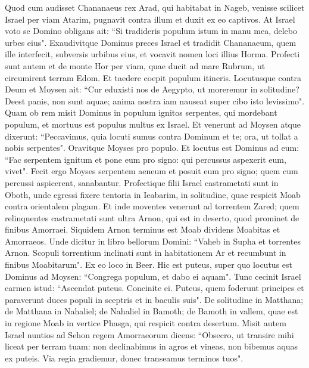 \begin{biblechapter}  
\verse Quod cum audisset Chananaeus rex Arad, qui habitabat in Nageb, venisse scilicet Israel per viam Atarim, pugnavit contra illum et duxit ex eo captivos. 
\verse At Israel voto se Domino obligans ait: “Si tradideris populum istum in manu mea, delebo urbes eius". 
\verse Exaudivitque Dominus preces Israel et tradidit Chananaeum, quem ille interfecit, subversis urbibus eius, et vocavit nomen loci illius Horma. 
\verse Profecti sunt autem et de monte Hor per viam, quae ducit ad mare Rubrum, ut circumirent terram Edom. Et taedere coepit populum itineris. 
\verse Locutusque contra Deum et Moysen ait: “Cur eduxisti nos de Aegypto, ut moreremur in solitudine? Deest panis, non sunt aquae; anima nostra iam nauseat super cibo isto levissimo". 
\verse Quam ob rem misit Dominus in populum ignitos serpentes, qui mordebant populum, et mortuus est populus multus ex Israel. 
\verse Et venerunt ad Moysen atque dixerunt: “Peccavimus, quia locuti sumus contra Dominum et te; ora, ut tollat a nobis serpentes". Oravitque Moyses pro populo. 
\verse Et locutus est Dominus ad eum: “Fac serpentem ignitum et pone eum pro signo: qui percussus aspexerit eum, vivet". 
\verse Fecit ergo Moyses serpentem aeneum et posuit eum pro signo; quem cum percussi aspicerent, sanabantur. 
\verse Profectique filii Israel castrametati sunt in Oboth, 
\verse unde egressi fixere tentoria in Ieabarim, in solitudine, quae respicit Moab contra orientalem plagam. 
\verse Et inde moventes venerunt ad torrentem Zared; 
\verse quem relinquentes castrametati sunt ultra Arnon, qui est in deserto, quod prominet de finibus Amorraei. Siquidem Arnon terminus est Moab dividens Moabitas et Amorraeos. 
\verse Unde dicitur in libro bellorum Domini: “Vaheb in Supha et torrentes Arnon. 
\verse Scopuli torrentium inclinati sunt in habitationem Ar et recumbunt in finibus Moabitarum". 
\verse Ex eo loco in Beer. Hic est puteus, super quo locutus est Dominus ad Moysen: “Congrega populum, et dabo ei aquam". 
\verse Tunc cecinit Israel carmen istud: “Ascendat puteus. Concinite ei. 
\verse Puteus, quem foderunt principes et paraverunt duces populi in sceptris et in baculis suis". De solitudine in Matthana; 
\verse de Matthana in Nahaliel; de Nahaliel in Bamoth; 
\verse de Bamoth in vallem, quae est in regione Moab in vertice Phasga, qui respicit contra desertum. 
\verse Misit autem Israel nuntios ad Sehon regem Amorraeorum dicens: 
\verse “Obsecro, ut transire mihi liceat per terram tuam: non declinabimus in agros et vineas, non bibemus aquas ex puteis. Via regia gradiemur, donec transeamus terminos tuos". 

\end{biblechapter}
